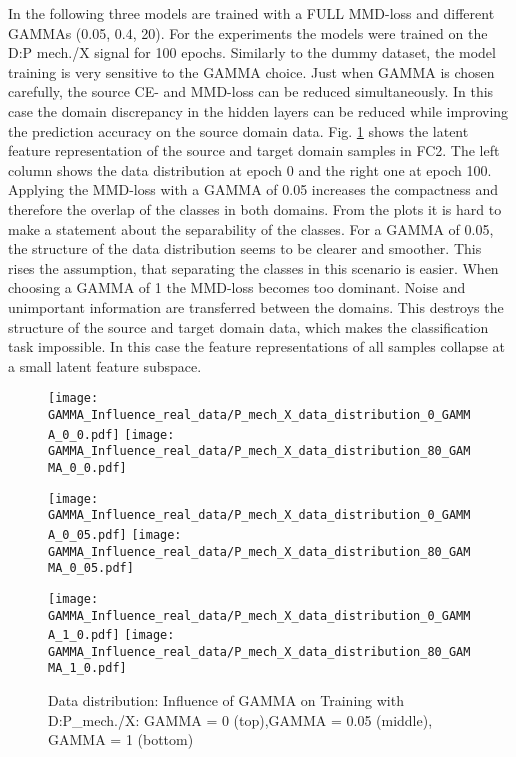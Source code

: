 In the following three models are trained with a FULL MMD-loss and different GAMMAs (0.05, 0.4, 20). For the experiments the models were trained on the  D:P mech./X signal for 100 epochs. Similarly to the dummy dataset, the model training is very sensitive to the GAMMA choice. Just when GAMMA is chosen carefully, the source CE- and MMD-loss can be reduced simultaneously. In this case the domain discrepancy in the hidden layers can be reduced while improving the prediction accuracy on the source domain data. Fig. \ref{fig:distribution_GAMMA_influence_real_data} shows the latent feature representation of the source and target domain samples in FC2. The left column shows the data distribution at epoch 0 and the right one at epoch 100. Applying the MMD-loss with a GAMMA of 0.05 increases the compactness and therefore the overlap of the classes in both domains. From the plots it is hard to make a statement about the separability of the classes. For a GAMMA of 0.05, the structure of the data distribution seems to be clearer and smoother. This rises the assumption, that separating the classes in this scenario is easier. When choosing a GAMMA of 1 the MMD-loss becomes too dominant. Noise and unimportant information are transferred between the domains. This destroys the structure of the source and target domain data, which makes the classification task impossible. In this case the feature representations of all samples collapse at a small latent feature subspace.

\begin{figure}[htp]
  \centering
  \texttt{[image: GAMMA\_Influence\_real\_data/P\_mech\_X\_data\_distribution\_0\_GAMMA\_0\_0.pdf]}
  \hspace{.4cm}
  \texttt{[image: GAMMA\_Influence\_real\_data/P\_mech\_X\_data\_distribution\_80\_GAMMA\_0\_0.pdf]}

  \vspace{.1cm}

  \texttt{[image: GAMMA\_Influence\_real\_data/P\_mech\_X\_data\_distribution\_0\_GAMMA\_0\_05.pdf]}
  \hspace{.4cm}
  \texttt{[image: GAMMA\_Influence\_real\_data/P\_mech\_X\_data\_distribution\_80\_GAMMA\_0\_05.pdf]}

  \vspace{.1cm}

  \texttt{[image: GAMMA\_Influence\_real\_data/P\_mech\_X\_data\_distribution\_0\_GAMMA\_1\_0.pdf]}
  \hspace{.4cm}
  \texttt{[image: GAMMA\_Influence\_real\_data/P\_mech\_X\_data\_distribution\_80\_GAMMA\_1\_0.pdf]}

  \vspace{.1cm}

  \caption{Data  distribution:  Influence  of  GAMMA  on  Training with D:P\_mech./X:  GAMMA  =  0  (top),GAMMA = 0.05 (middle), GAMMA = 1 (bottom)}
  \label{fig:distribution_GAMMA_influence_real_data}
\end{figure}


